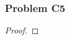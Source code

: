 \documentclass[../../../main.tex]{subfiles}
\begin{document}
\subsubsection{Problem C5}
\begin{wts}

\end{wts}
\begin{proof}

\end{proof}
\end{document}
